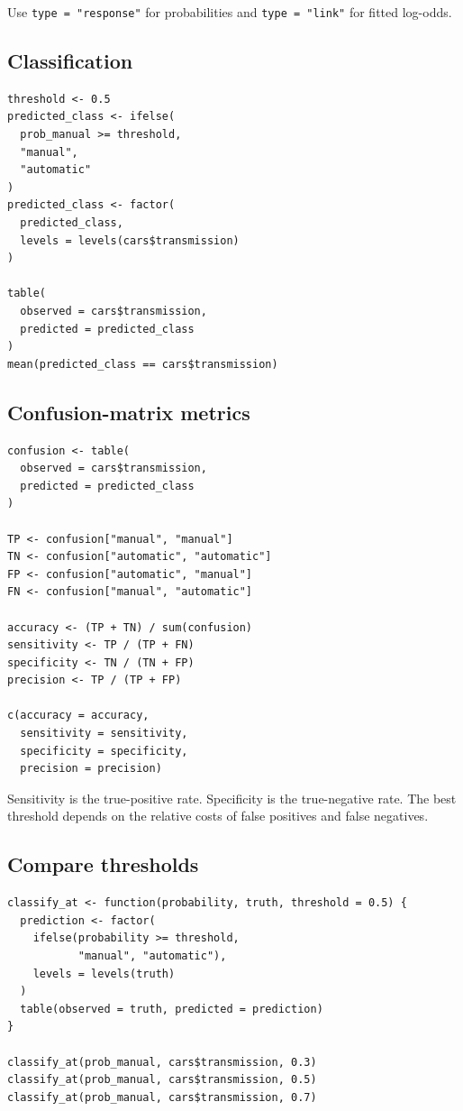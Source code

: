 \documentclass[11pt]{article}
\begin{document}
Use \texttt{type = "response"} for probabilities and
\texttt{type = "link"} for fitted log-odds.

\subsection{Classification}
\begin{lstlisting}
threshold <- 0.5
predicted_class <- ifelse(
  prob_manual >= threshold,
  "manual",
  "automatic"
)
predicted_class <- factor(
  predicted_class,
  levels = levels(cars$transmission)
)

table(
  observed = cars$transmission,
  predicted = predicted_class
)
mean(predicted_class == cars$transmission)
\end{lstlisting}

\subsection{Confusion-matrix metrics}
\begin{lstlisting}
confusion <- table(
  observed = cars$transmission,
  predicted = predicted_class
)

TP <- confusion["manual", "manual"]
TN <- confusion["automatic", "automatic"]
FP <- confusion["automatic", "manual"]
FN <- confusion["manual", "automatic"]

accuracy <- (TP + TN) / sum(confusion)
sensitivity <- TP / (TP + FN)
specificity <- TN / (TN + FP)
precision <- TP / (TP + FP)

c(accuracy = accuracy,
  sensitivity = sensitivity,
  specificity = specificity,
  precision = precision)
\end{lstlisting}

Sensitivity is the true-positive rate. Specificity is the true-negative rate.
The best threshold depends on the relative costs of false positives and false
negatives.

\subsection{Compare thresholds}
\begin{lstlisting}
classify_at <- function(probability, truth, threshold = 0.5) {
  prediction <- factor(
    ifelse(probability >= threshold,
           "manual", "automatic"),
    levels = levels(truth)
  )
  table(observed = truth, predicted = prediction)
}

classify_at(prob_manual, cars$transmission, 0.3)
classify_at(prob_manual, cars$transmission, 0.5)
classify_at(prob_manual, cars$transmission, 0.7)
\end{lstlisting}
\end{document}
